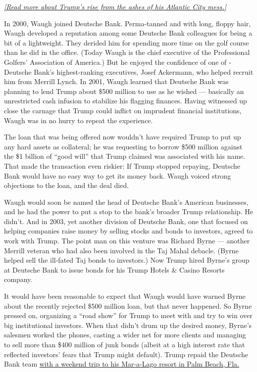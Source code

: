\emph{\href{https://www.nytimes3xbfgragh.onion/2004/09/12/magazine/trumpologies.html}{{[}Read
more about Trump's rise from the ashes of his Atlantic City mess.{]}}}

In 2000, Waugh joined ­Deutsche Bank. Perma-­tanned and with long,
floppy hair, Waugh developed a reputation among some ­Deutsche Bank
colleagues for being a bit of a lightweight. They derided him for
spending more time on the golf course than he did in the office. (Today
Waugh is the chief executive of the Professional Golfers' Association of
America.) But he enjoyed the confidence of one of ­Deutsche Bank's
highest-­ranking executives, Josef Ackermann, who helped recruit him
from Merrill Lynch. In 2001, Waugh learned that ­Deutsche Bank was
planning to lend Trump about \$500 million to use as he wished ---
basically an unrestricted cash infusion to stabilize his flagging
finances. Having witnessed up close the carnage that Trump could inflict
on imprudent financial institutions, Waugh was in no hurry to repeat the
experience.

The loan that was being offered now wouldn't have required Trump to put
up any hard assets as collateral; he was requesting to borrow \$500
million against the \$1 billion of ``good will'' that Trump claimed was
associated with his name. That made the transaction even riskier: If
Trump stopped repaying, ­Deutsche Bank would have no easy way to get its
money back. Waugh voiced strong objections to the loan, and the deal
died.

Waugh would soon be named the head of Deutsche Bank's American
businesses, and he had the power to put a stop to the bank's broader
Trump relationship. He didn't. And in 2003, yet another division of
­Deutsche Bank, one that focused on helping companies raise money by
selling stocks and bonds to investors, agreed to work with Trump. The
point man on this venture was Richard Byrne --- another Merrill veteran
who had also been involved in the Taj Mahal debacle. (Byrne helped sell
the ill-­fated Taj bonds to investors.) Now Trump hired Byrne's group at
­Deutsche Bank to issue bonds for his Trump Hotels \& Casino Resorts
company.

It would have been reasonable to expect that Waugh would have warned
Byrne about the recently rejected \$500 million loan, but that never
happened. So Byrne pressed on, organizing a ``road show'' for Trump to
meet with and try to win over big institutional investors. When that
didn't drum up the desired money, Byrne's salesmen worked the phones,
casting a wider net for more clients and managing to sell more than
\$400 million of junk bonds (albeit at a high interest rate that
reflected investors' fears that Trump might default). Trump repaid the
­Deutsche Bank team
\href{https://www.nytimes3xbfgragh.onion/2019/03/18/business/trump-deutsche-bank.html}{with
a weekend trip to his Mar-­a-­Lago resort in Palm Beach, Fla.}

